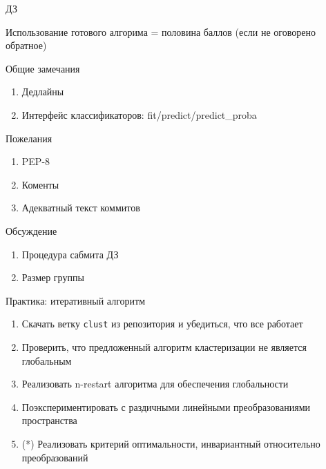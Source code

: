 \documentclass[10pt,a4paper]{beamer}
\begin{document}

\begin{frame}{ДЗ}

Использование готового алгорима = половина баллов (если не оговорено обратное)

\vspace{1em}
Общие замечания
\begin{enumerate}
\item Дедлайны
\item Интерфейс классификаторов: fit/predict/predict\_proba
\end{enumerate}

Пожелания
\begin{enumerate}
\item PEP-8
\item Коменты
\item Адекватный текст коммитов
\end{enumerate}

Обсуждение
\begin{enumerate}
\item Процедура сабмита ДЗ
\item Размер группы
\end{enumerate}

\end{frame}


\begin{frame}{Практика: итеративный алгоритм}

\begin{enumerate}
\item Скачать ветку \texttt{clust} из репозитория и убедиться, что все работает
\item Проверить, что предложенный алгоритм кластеризации не является глобальным
\item Реализовать n-restart алгоритма для обеспечения глобальности
\item Поэкспериментировать с раздичными линейными преобразованиями пространства
\item (*) Реализовать критерий оптимальности, инвариантный относительно преобразований
\end{enumerate}

\end{frame}
\end{document}
